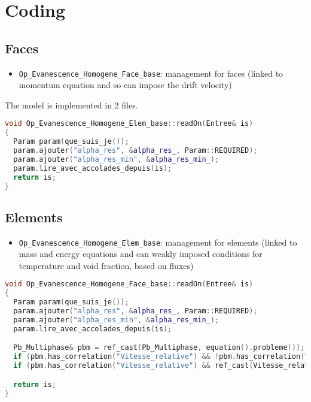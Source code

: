 \section{Coding\label{eva:coding}}

\subsection{Faces}
\begin{itemize}
    \item[\small \textcolor{blue}{\ding{109}}]\texttt{Op\_Evanescence\_Homogene\_Face\_base}: management for faces (linked to momentum equation and so can impose the drift velocity) 
\end{itemize}
The model is implemented in 2 files.
\begin{lstlisting}[language=c++]
void Op_Evanescence_Homogene_Elem_base::readOn(Entree& is)
{
  Param param(que_suis_je());
  param.ajouter("alpha_res", &alpha_res_, Param::REQUIRED);
  param.ajouter("alpha_res_min", &alpha_res_min_);
  param.lire_avec_accolades_depuis(is);
  return is;
}
\end{lstlisting}

\subsection{Elements}

\begin{itemize}
    \item[\small \textcolor{blue}{\ding{109}}]\texttt{Op\_Evanescence\_Homogene\_Elem\_base}: management for elements (linked to mass and energy equations and can weakly imposed conditions for temperature and void fraction, based on fluxes)
\end{itemize}
\begin{lstlisting}[language=c++]
void Op_Evanescence_Homogene_Face_base::readOn(Entree& is)
{
  Param param(que_suis_je());
  param.ajouter("alpha_res", &alpha_res_, Param::REQUIRED);
  param.ajouter("alpha_res_min", &alpha_res_min_);
  param.lire_avec_accolades_depuis(is);

  Pb_Multiphase& pbm = ref_cast(Pb_Multiphase, equation().probleme());
  if (pbm.has_correlation("Vitesse_relative") && !pbm.has_correlation("gravite")) Process::exit(que_suis_je() + " : you must define a multiphase gravity field if you want a drift flux!!");
  if (pbm.has_correlation("Vitesse_relative") && ref_cast(Vitesse_relative_base, pbm.get_correlation("Vitesse_relative").valeur()).needs_vort()) pbm.creer_champ("vorticite");

  return is;
}
\end{lstlisting}

